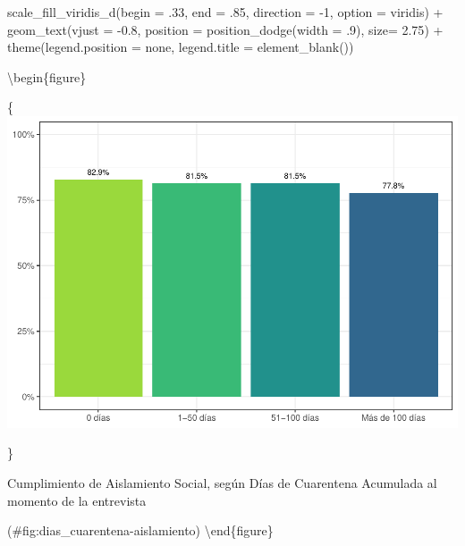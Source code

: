 \documentclass[
  12pt,
]{book}
\newenvironment{Shaded}{\begin{snugshade}}{\end{snugshade}}
\newcommand{\AttributeTok}[1]{\textcolor[rgb]{0.77,0.63,0.00}{#1}}
\newcommand{\DecValTok}[1]{\textcolor[rgb]{0.00,0.00,0.81}{#1}}
\newcommand{\FloatTok}[1]{\textcolor[rgb]{0.00,0.00,0.81}{#1}}
\newcommand{\FunctionTok}[1]{\textcolor[rgb]{0.00,0.00,0.00}{#1}}
\newcommand{\NormalTok}[1]{#1}
\newcommand{\SpecialCharTok}[1]{\textcolor[rgb]{0.00,0.00,0.00}{#1}}
\newcommand{\StringTok}[1]{\textcolor[rgb]{0.31,0.60,0.02}{#1}}
\begin{document}
\begin{Shaded}
\begin{Highlighting}[]
  \FunctionTok{scale\_fill\_viridis\_d}\NormalTok{(}\AttributeTok{begin =}\NormalTok{ .}\DecValTok{33}\NormalTok{, }\AttributeTok{end =}\NormalTok{ .}\DecValTok{85}\NormalTok{, }\AttributeTok{direction =} \SpecialCharTok{{-}}\DecValTok{1}\NormalTok{, }\AttributeTok{option =} \StringTok{\textquotesingle{}viridis\textquotesingle{}}\NormalTok{) }\SpecialCharTok{+}
  \FunctionTok{geom\_text}\NormalTok{(}\AttributeTok{vjust =} \SpecialCharTok{{-}}\FloatTok{0.8}\NormalTok{,}
            \AttributeTok{position =} \FunctionTok{position\_dodge}\NormalTok{(}\AttributeTok{width =}\NormalTok{ .}\DecValTok{9}\NormalTok{),}
            \AttributeTok{size=} \FloatTok{2.75}\NormalTok{) }\SpecialCharTok{+} 
  \FunctionTok{theme}\NormalTok{(}\AttributeTok{legend.position =} \StringTok{\textquotesingle{}none\textquotesingle{}}\NormalTok{,}
        \AttributeTok{legend.title =} \FunctionTok{element\_blank}\NormalTok{())}
\end{Highlighting}
\end{Shaded}

\textbackslash begin\{figure\}

\{\centering \includegraphics{reporte-elsoc_files/figure-latex/dias_cuarentena-aislamiento-1}

\}

\caption{Cumplimiento de Aislamiento Social, según Días de Cuarentena Acumulada al momento de la entrevista}

(\#fig:dias\_cuarentena-aislamiento)
\textbackslash end\{figure\}
\end{document}
